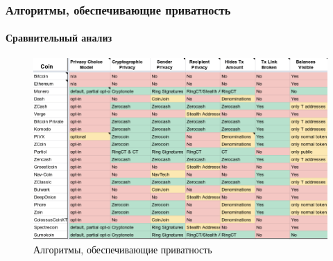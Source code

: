 \documentclass{beamer}
\begin{document}
\begin{frame}
    \frametitle{Алгоритмы, обеспечивающие приватность}
    \framesubtitle{Сравнительный анализ}
    \begin{figure}
        \includegraphics[width=\columnwidth]{sravn3.png}
        \caption{Алгоритмы, обеспечивающие приватность}
    \end{figure}
\end{frame}
\end{document}
